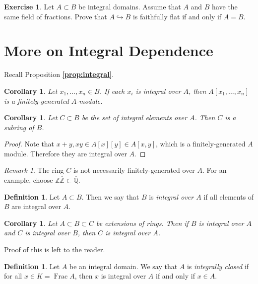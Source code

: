 \documentclass[leqno, openany]{memoir}
\newtheorem{cor}[thm]{Corollary}
\theoremstyle{definition}
\newtheorem{defn}[thm]{Definition}
\newtheorem{exer}[thm]{Exercise}
\theoremstyle{remark}
\newtheorem{rmk}[thm]{Remark}
\theoremstyle{plain}
\theoremstyle{definition}
\theoremstyle{remark}
\newcommand{\Z}{\mathbb{Z}}
\newcommand{\Q}{\mathbb{Q}}
\newcommand{\ol}[1]{\overline{#1}}
\begin{document}
\begin{exer}
    Let $A \subset B$ be integral domains. Assume that $A$ and $B$ have the same field of fractions. Prove that $A \hookrightarrow B$ is faithfully flat if and only if $A = B$.
\end{exer}

\section{More on Integral Dependence}%
\label{sec:more_on_integral_dependence}

Recall Proposition \textbf{\ref{prop:integral}}. 

\begin{cor}
    Let $x_1, \ldots, x_n \in B$. If each $x_i$ is integral over $A$, then $A[x_1, \ldots, x_n]$ is a finitely-generated $A$-module.
\end{cor}

\begin{cor}
    Let $C \subset B$ be the set of integral elements over $A$. Then $C$ is a subring of $B$.
\end{cor}

\begin{proof}
    Note that $x + y, xy \in A[x][y] \in A[x,y]$, which is a finitely-generated $A$ module. Therefore they are integral over $A$.
\end{proof}

\begin{rmk}
    The ring $C$ is not necessarily finitely-generated over $A$. For an example, choose $\Z \ol{\Z} \subset \ol{\Q}$.
\end{rmk}

\begin{defn}
    Let $A \subset B$. Then we say that $B$ is \textit{integral over $A$} if all elements of $B$ are integral over $A$.
\end{defn}

\begin{cor}
    Let $A \subset B \subset C$ be extensions of rings. Then if $B$ is integral over $A$ and $C$ is integral over $B$, then $C$ is integral over $A$.
\end{cor}

Proof of this is left to the reader.

\begin{defn}
    Let $A$ be an integral domain. We say that $A$ is \textit{integrally closed} if for all $x \in K = \operatorname{Frac} A$, then $x$ is integral over $A$ if and only if $x \in A$.
\end{defn}
\end{document}
